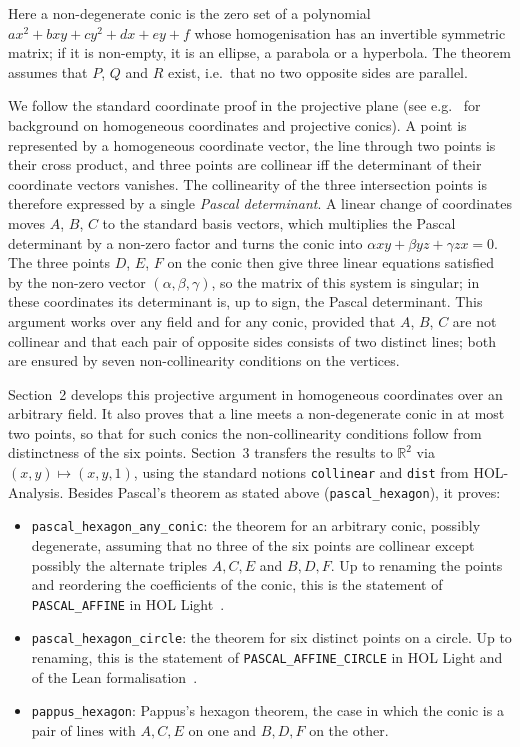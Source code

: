 \documentclass[11pt,a4paper]{article}
\begin{document}
Here a non-degenerate conic is the zero set of a polynomial
$ax^2 + bxy + cy^2 + dx + ey + f$ whose homogenisation has an invertible symmetric
matrix; if it is non-empty, it is an ellipse, a parabola or a hyperbola. The theorem
assumes that $P$, $Q$ and $R$ exist, i.e.\ that no two opposite sides are parallel.

We follow the standard coordinate proof in the projective plane (see
e.g.~\cite{richter-gebert2011} for background on homogeneous coordinates and projective
conics). A point is represented by a homogeneous coordinate vector, the line through two
points is their cross product, and three points are collinear iff the determinant of their
coordinate vectors vanishes. The collinearity of the three intersection points is
therefore expressed by a single \emph{Pascal determinant}. A linear change of coordinates
moves $A$, $B$, $C$ to the standard basis vectors, which multiplies the Pascal determinant
by a non-zero factor and turns the conic into $\alpha xy + \beta yz + \gamma zx = 0$. The
three points $D$, $E$, $F$ on the conic then give three linear equations satisfied by the
non-zero vector $(\alpha, \beta, \gamma)$, so the matrix of this system is singular; in
these coordinates its determinant is, up to sign, the Pascal determinant. This argument works
over any field and for any conic, provided that $A$, $B$, $C$ are not collinear and that
each pair of opposite sides consists of two distinct lines; both are ensured by seven
non-collinearity conditions on the vertices.

Section~2 develops this projective argument in homogeneous coordinates over an arbitrary
field. It also proves that a line meets a non-degenerate conic in at most two points, so
that for such conics the non-collinearity conditions follow from distinctness of the six
points. Section~3 transfers the results to $\mathbb{R}^2$ via $(x, y) \mapsto (x, y, 1)$,
using the standard notions \texttt{collinear} and \texttt{dist} from HOL-Analysis. Besides
Pascal's theorem as stated above (\texttt{pascal\_hexagon}), it proves:
\begin{itemize}
\item \texttt{pascal\_hexagon\_any\_conic}: the theorem for an arbitrary conic, possibly
  degenerate, assuming that no three of the six points are collinear except possibly the
  alternate triples $A, C, E$ and $B, D, F$. Up to renaming the points and reordering the
  coefficients of the conic, this is the statement of \texttt{PASCAL\_AFFINE} in
  HOL Light~\cite{harrison-pascal}.
\item \texttt{pascal\_hexagon\_circle}: the theorem for six distinct points on a circle.
  Up to renaming, this is the statement of \texttt{PASCAL\_AFFINE\_CIRCLE} in HOL Light and
  of the Lean formalisation~\cite{alexeev-pascal}.
\item \texttt{pappus\_hexagon}: Pappus's hexagon theorem, the case in which the conic is
  a pair of lines with $A, C, E$ on one and $B, D, F$ on the other.
\end{itemize}
\end{document}
